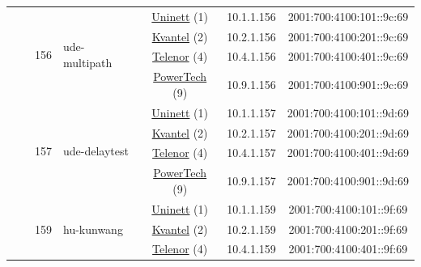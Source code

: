 \begin{small}
\begin{center}
\begin{longtable}{|c|c|c|c|c|c|c|c|}
  &  & \multirow{4}{*}{\tiny{156}} & \multicolumn{1}{|l|}{\multirow{4}{*}{\tiny{ude-multipath}}} & \multicolumn{2}{|c|}{\tiny{\href{https://www.uninett.no}{Uninett} (1)}} & \tiny{10.1.1.156} & \tiny{2001:700:4100:101::9c:69} \\* \cline{5-5}\cline{6-6}\cline{7-7}\cline{8-8}
  &  &  &  & \multicolumn{2}{|c|}{\tiny{\href{http://kvantel.no}{Kvantel} (2)}} & \tiny{10.2.1.156} & \tiny{2001:700:4100:201::9c:69} \\* \cline{5-5}\cline{6-6}\cline{7-7}\cline{8-8}
  &  &  &  & \multicolumn{2}{|c|}{\tiny{\href{https://www.telenor.no}{Telenor} (4)}} & \tiny{10.4.1.156} & \tiny{2001:700:4100:401::9c:69} \\* \cline{5-5}\cline{6-6}\cline{7-7}\cline{8-8}
  &  &  &  & \multicolumn{2}{|c|}{\tiny{\href{http://www.powertech.no}{PowerTech} (9)}} & \tiny{10.9.1.156} & \tiny{2001:700:4100:901::9c:69} \\* \cline{3-3}\cline{4-4}\cline{5-5}\cline{6-6}\cline{7-7}\cline{8-8}
  &  & \multirow{4}{*}{\tiny{157}} & \multicolumn{1}{|l|}{\multirow{4}{*}{\tiny{ude-delaytest}}} & \multicolumn{2}{|c|}{\tiny{\href{https://www.uninett.no}{Uninett} (1)}} & \tiny{10.1.1.157} & \tiny{2001:700:4100:101::9d:69} \\* \cline{5-5}\cline{6-6}\cline{7-7}\cline{8-8}
  &  &  &  & \multicolumn{2}{|c|}{\tiny{\href{http://kvantel.no}{Kvantel} (2)}} & \tiny{10.2.1.157} & \tiny{2001:700:4100:201::9d:69} \\* \cline{5-5}\cline{6-6}\cline{7-7}\cline{8-8}
  &  &  &  & \multicolumn{2}{|c|}{\tiny{\href{https://www.telenor.no}{Telenor} (4)}} & \tiny{10.4.1.157} & \tiny{2001:700:4100:401::9d:69} \\* \cline{5-5}\cline{6-6}\cline{7-7}\cline{8-8}
  &  &  &  & \multicolumn{2}{|c|}{\tiny{\href{http://www.powertech.no}{PowerTech} (9)}} & \tiny{10.9.1.157} & \tiny{2001:700:4100:901::9d:69} \\* \cline{3-3}\cline{4-4}\cline{5-5}\cline{6-6}\cline{7-7}\cline{8-8}
  &  & \multirow{4}{*}{\tiny{159}} & \multicolumn{1}{|l|}{\multirow{4}{*}{\tiny{hu-kunwang}}} & \multicolumn{2}{|c|}{\tiny{\href{https://www.uninett.no}{Uninett} (1)}} & \tiny{10.1.1.159} & \tiny{2001:700:4100:101::9f:69} \\* \cline{5-5}\cline{6-6}\cline{7-7}\cline{8-8}
  &  &  &  & \multicolumn{2}{|c|}{\tiny{\href{http://kvantel.no}{Kvantel} (2)}} & \tiny{10.2.1.159} & \tiny{2001:700:4100:201::9f:69} \\* \cline{5-5}\cline{6-6}\cline{7-7}\cline{8-8}
  &  &  &  & \multicolumn{2}{|c|}{\tiny{\href{https://www.telenor.no}{Telenor} (4)}} & \tiny{10.4.1.159} & \tiny{2001:700:4100:401::9f:69} \\* \cline{5-5}\cline{6-6}\cline{7-7}\cline{8-8}

\end{longtable}
\end{center}
\end{small}
